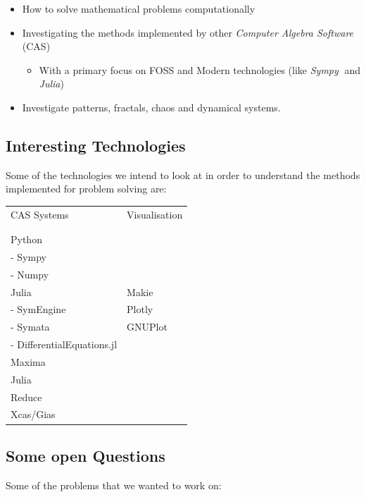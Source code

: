 \documentclass[11pt]{article}
\begin{document}
\begin{itemize}
\item How to solve mathematical problems computationally
\item Investigating the methods implemented by other \emph{Computer Algebra Software}
(CAS)
\begin{itemize}
\item With a primary focus on FOSS and Modern technologies (like \emph{Sympy🐍} and
\emph{Julia})
\end{itemize}
\item Investigate patterns, fractals, chaos and dynamical systems.
\end{itemize}



\subsection{Interesting Technologies}
\label{sec:orge03ffdd}

Some of the technologies we intend to look at in order to understand the methods implemented for problem solving are:


\begin{center}
\begin{tabular}{|l|l|}
\hline
CAS Systems & Visualisation \\
 & \\
 & \\
\hline
Python & \\
- Sympy & \\
- Numpy & \\
Julia & Makie \\
- SymEngine & Plotly \\
- Symata & GNUPlot \\
- DifferentialEquations.jl & \\
Maxima & \\
Julia & \\
Reduce & \\
Xcas/Gias & \\
\hline
\end{tabular}
\end{center}

\subsection{Some open Questions}
\label{sec:orgcf98535}

Some of the problems that we wanted to work on:
\end{document}
